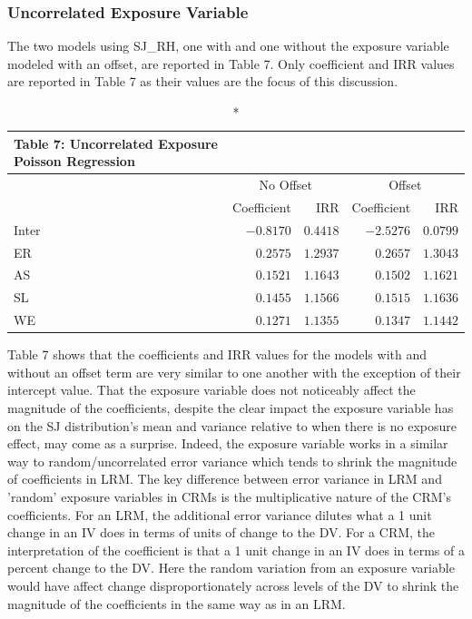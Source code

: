 \documentclass[ShortAfour,times,sageapa]{sagej}
\begin{document}
		\subsubsection{Uncorrelated Exposure Variable}
		
	The two models using SJ\_RH, one with and one without the exposure variable modeled with an offset, are reported in Table 7.
	Only coefficient and IRR values are reported in Table 7 as their values are the focus of this discussion.
		
	\begin{longtable}{l|rrrr}
		\caption*{
			{\large Table 7: Uncorrelated Exposure Poisson Regression}
		} \\ 
		\toprule
		\multicolumn{1}{l}{} & \multicolumn{2}{c}{No Offset} & \multicolumn{2}{c}{Offset} \\ 
		\cmidrule(lr){2-3} \cmidrule(lr){4-5}
		\multicolumn{1}{l}{} & Coefficient & IRR & Coefficient & IRR \\ 
		\midrule
		Inter & $-0.8170$ & $0.4418$ & $-2.5276$ & $0.0799$ \\ 
		ER & $0.2575$ & $1.2937$ & $0.2657$ & $1.3043$ \\ 
		AS & $0.1521$ & $1.1643$ & $0.1502$ & $1.1621$ \\ 
		SL & $0.1455$ & $1.1566$ & $0.1515$ & $1.1636$ \\ 
		WE & $0.1271$ & $1.1355$ & $0.1347$ & $1.1442$ \\ 
		\bottomrule
	\end{longtable}
	
	Table 7 shows that the coefficients and IRR values for the models with and without an offset term are very similar to one another with the exception of their intercept value.
	That the exposure variable does not noticeably affect the magnitude of the coefficients, despite the clear impact the exposure variable has on the SJ distribution's mean and variance relative to when there is no exposure effect, may come as a surprise.
	Indeed, the exposure variable works in a similar way to random/uncorrelated error variance which tends to shrink the magnitude of coefficients in LRM.
	The key difference between error variance in LRM and 'random' exposure variables in CRMs is the multiplicative nature of the CRM's coefficients.
	For an LRM, the additional error variance dilutes what a 1 unit change in an IV does in terms of units of change to the DV.
	For a CRM, the interpretation of the coefficient is that a 1 unit change in an IV does in terms of a percent change to the DV.
	Here the random variation from an exposure variable would have affect change disproportionately across levels of the DV to shrink the magnitude of the coefficients in the same way as in an LRM.
	
\end{document}
